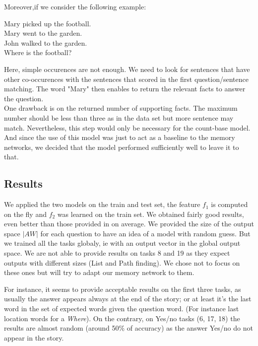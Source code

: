 \documentclass[paper=a4, fontsize=11pt]{scrartcl} %
\numberwithin{equation}{section} %
\numberwithin{figure}{section} %
\numberwithin{table}{section} %
\begin{document}
Moreover,if we consider the following example:\\
\begin{center}
Mary picked up the football.\\
Mary went to the garden.\\
John walked to the garden.\\
Where is the football?
\end{center}

Here, simple occurences are not enough. We need to look for sentences that have other co-occurences with the sentences that scored in the first question/sentence matching. The word "Mary" then enables to return the relevant facts to answer the question.\\

One drawback is on the returned number of supporting facts. The maximum number should be less than three as in the data set but more sentence may match. Nevertheless, this step would only be necessary for the count-base model. And since the use of this model was just to act as a baseline to the memory networks, we decided that the model performed sufficiently well to leave it to that.

\subsection{Results}

We applied the two models on the train and test set, the feature $f_1$ is computed on the fly and $f_2$ was learned on the train set. We obtained fairly good results, even better than those provided in \cite{aiqua} on average. We provided the size of the output space $|AW|$ for each question to have an idea of a model with random guess. But we trained all the tasks globaly, ie with an output vector in the global output space. We are not able to provide results on tasks 8 and 19 as they expect outputs with different sizes (List and Path finding). We chose not to focus on these ones but will try to adapt our memory network to them.

For instance, it seems to provide acceptable results on the first three tasks, as usually the answer appears always at the end of the story; or at least it's the last word in the set of expected words given the question word. (For instance last location words for a \textit{Where}). On the contrary, on Yes/no tasks (6, 17, 18) the results are almost random (around 50\% of accuracy) as the answer Yes/no do not appear in the story.
\end{document}
